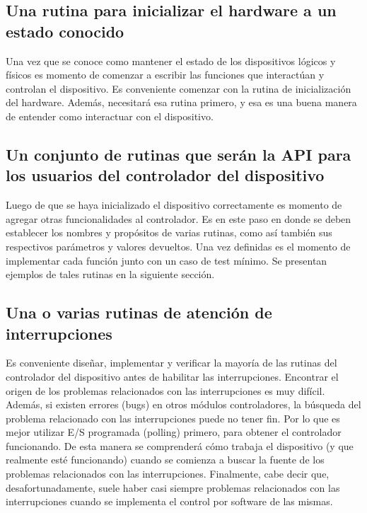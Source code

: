 \documentclass[output=paper, 
colorlinks,
citecolor=brown,
newtxmath
]{langscibook}
\begin{document}
\subsection{Una rutina para inicializar el hardware a un estado conocido}

Una vez que se conoce como mantener el estado de los dispositivos 
lógicos y físicos es momento de comenzar a escribir las funciones que 
interactúan y controlan el dispositivo. Es conveniente comenzar 
con la rutina de inicialización del hardware. Además, necesitará
esa rutina primero, y esa es una buena manera de entender como interactuar
con el dispositivo.

\subsection{Un conjunto de rutinas que serán la API para los
usuarios del controlador del dispositivo}

Luego de que se haya inicializado el dispositivo correctamente es
momento de agregar otras funcionalidades al controlador. Es en este
paso en donde se deben establecer los nombres y propósitos de varias 
rutinas, como así también sus respectivos parámetros y valores devueltos.
Una vez definidas es el momento de implementar cada función junto
con un caso de test mínimo. Se presentan ejemplos de tales rutinas
en la siguiente sección.

\subsection{Una o varias rutinas de atención de interrupciones}

Es conveniente diseñar, implementar y verificar la mayoría de las rutinas
del controlador del dispositivo antes de habilitar las interrupciones.
Encontrar el origen de los problemas relacionados con las interrupciones
es muy difícil. Además, si existen errores (bugs) en otros módulos
controladores, la búsqueda del problema relacionado con las interrupciones
puede no tener fin. Por lo que es mejor utilizar 
E/S programada (polling) primero, para obtener el controlador funcionando.
De esta manera se comprenderá cómo trabaja el dispositivo (y que 
realmente esté funcionando) cuando se comienza a buscar la fuente
de los problemas relacionados con las interrupciones. Finalmente, cabe
decir que, desafortunadamente, suele haber casi siempre problemas 
relacionados con las interrupciones cuando se implementa el control por 
software de las mismas.
\end{document}
